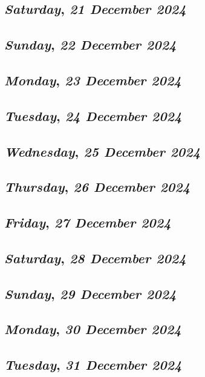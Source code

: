 \def\day{\textit{21 December 2024}}
\def\weekday{\textit{Saturday}}
\subsection*{\weekday, \day}

\def\day{\textit{22 December 2024}}
\def\weekday{\textit{Sunday}}
\subsection*{\weekday, \day}

\def\day{\textit{23 December 2024}}
\def\weekday{\textit{Monday}}
\subsection*{\weekday, \day}

\def\day{\textit{24 December 2024}}
\def\weekday{\textit{Tuesday}}
\subsection*{\weekday, \day}

\def\day{\textit{25 December 2024}}
\def\weekday{\textit{Wednesday}}
\subsection*{\weekday, \day}

\def\day{\textit{26 December 2024}}
\def\weekday{\textit{Thursday}}
\subsection*{\weekday, \day}

\def\day{\textit{27 December 2024}}
\def\weekday{\textit{Friday}}
\subsection*{\weekday, \day}

\def\day{\textit{28 December 2024}}
\def\weekday{\textit{Saturday}}
\subsection*{\weekday, \day}

\def\day{\textit{29 December 2024}}
\def\weekday{\textit{Sunday}}
\subsection*{\weekday, \day}

\def\day{\textit{30 December 2024}}
\def\weekday{\textit{Monday}}
\subsection*{\weekday, \day}

\def\day{\textit{31 December 2024}}
\def\weekday{\textit{Tuesday}}
\subsection*{\weekday, \day}
